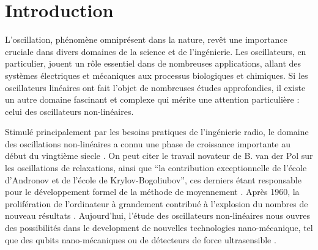 \chapter{Introduction}
L'oscillation, phénomène omniprésent dans la nature, revêt une importance cruciale dans divers domaines de la science et de l'ingénierie. Les oscillateurs, en particulier, jouent un rôle essentiel dans de nombreuses applications, allant des systèmes électriques et mécaniques aux processus biologiques et chimiques. Si les oscillateurs linéaires ont fait l'objet de nombreuses études approfondies, il existe un autre domaine fascinant et complexe qui mérite une attention particulière : celui des oscillateurs non-linéaires.


%
Stimulé principalement par les besoins pratiques de l'ingénierie radio,
le domaine des oscillations non-linéaires a connu une phase de croissance importante au début du vingtième siecle \cite{samoilenko_nn_1994}.
On peut citer le travail novateur de B. van der Pol sur les oscillations de relaxations, 
ainsi que ``la contribution exceptionnelle de l'école d'Andronov et de l'école de Krylov-Bogoliubov'', 
ces derniers étant responsable pour le développement formel de la méthode de moyennement \cite{mira_historical_1997}.
Après 1960, la prolifération de l'ordinateur à grandement contribué à l'explosion du nombres de nouveau résultats \cite{mira_historical_1997}.
Aujourd'hui, l'étude des oscillateurs non-linéaires nous ouvres des possibilités dans le development de nouvelles technologies nano-mécanique, 
tel que des qubits nano-mécaniques \cite{pistolesi_proposal_2021} ou de détecteurs de force ultrasensible \cite{moser_ultrasensitive_2013}.

